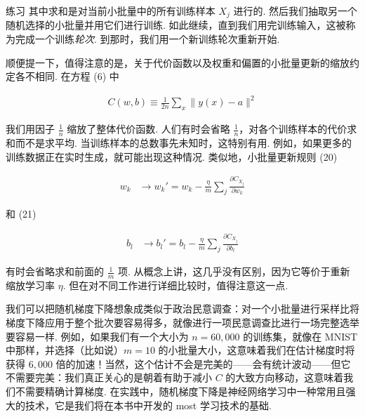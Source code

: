 \begin{exerciseBox}{练习}
\noindent 其中求和是对当前小批量中的所有训练样本 $X_j$ 进行的. 然后我们抽取另一个随机选择的小批量并用它们进行训练. 如此继续，直到我们用完训练输入，这被称为完成一个训练\emph{轮次}. 到那时，我们用一个新训练轮次重新开始.

顺便提一下，值得注意的是，关于代价函数以及权重和偏置的小批量更新的缩放约定各不相同. 在方程 (6) 中

\begin{align*}
C(w,b) \equiv \frac{1}{2n} \sum_x \| y(x) - a\|^2 \nonumber
\end{align*}

\noindent 我们用因子 $\frac{1}{n}$ 缩放了整体代价函数. 人们有时会省略 $\frac{1}{n}$，对各个训练样本的代价求和而不是求平均. 当训练样本的总数事先未知时，这特别有用. 例如，如果更多的训练数据正在实时生成，就可能出现这种情况. 类似地，小批量更新规则 (20)

\begin{align*}
w_k &\rightarrow w_k' = w_k-\frac{\eta}{m} \sum_j \frac{\partial C_{X_j}}{\partial w_k} \nonumber
\end{align*}

\noindent 和 (21)

\begin{align*}
b_l &\rightarrow b_l' = b_l-\frac{\eta}{m} \sum_j \frac{\partial C_{X_j}}{\partial b_l} \nonumber
\end{align*}

\noindent 有时会省略求和前面的 $\frac{1}{m}$ 项. 从概念上讲，这几乎没有区别，因为它等价于重新缩放学习率 $\eta$. 但在对不同工作进行详细比较时，值得注意这一点.

我们可以把随机梯度下降想象成类似于政治民意调查：对一个小批量进行采样比将梯度下降应用于整个批次要容易得多，就像进行一项民意调查比进行一场完整选举要容易一样. 例如，如果我们有一个大小为 $n = 60,000$ 的训练集，就像在 MNIST 中那样，并选择（比如说）$m = 10$ 的小批量大小，这意味着我们在估计梯度时将获得 $6,000$ 倍的加速！当然，这个估计不会是完美的——会有统计波动——但它不需要完美：我们真正关心的是朝着有助于减小 $C$ 的大致方向移动，这意味着我们不需要精确计算梯度. 在实践中，随机梯度下降是神经网络学习中一种常用且强大的技术，它是我们将在本书中开发的 most 学习技术的基础.

\end{exerciseBox}
